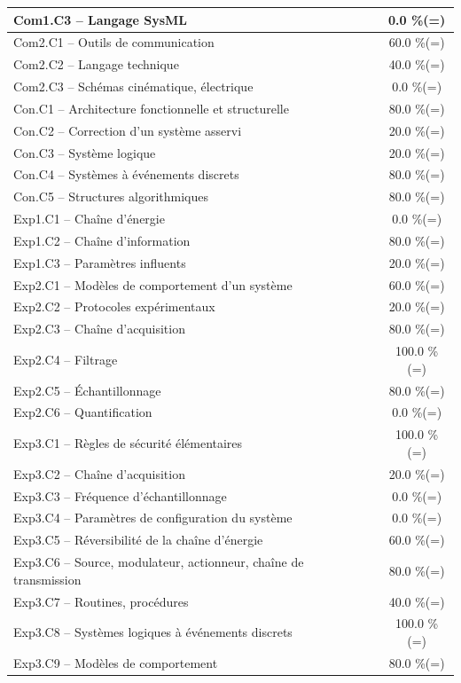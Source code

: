 \begin{center}
\begin{tabular}{|p{.7\linewidth}|c|}
Com1.C3 -- Langage SysML&0.0 \%(=)\\ \hline 
Com2.C1 -- Outils de communication&60.0 \%(=)\\ \hline 
Com2.C2 -- Langage technique&40.0 \%(=)\\ \hline 
Com2.C3 -- Schémas cinématique, électrique&0.0 \%(=)\\ \hline 
Con.C1 -- Architecture fonctionnelle et structurelle&80.0 \%(=)\\ \hline 
Con.C2 -- Correction d’un système asservi&20.0 \%(=)\\ \hline 
Con.C3 -- Système logique&20.0 \%(=)\\ \hline 
Con.C4 -- Systèmes à événements discrets&80.0 \%(=)\\ \hline 
Con.C5 -- Structures algorithmiques&80.0 \%(=)\\ \hline 
Exp1.C1 -- Chaîne d’énergie&0.0 \%(=)\\ \hline 
Exp1.C2 -- Chaîne d’information&80.0 \%(=)\\ \hline 
Exp1.C3 -- Paramètres influents&20.0 \%(=)\\ \hline 
Exp2.C1 -- Modèles de comportement d’un système&60.0 \%(=)\\ \hline 
Exp2.C2 -- Protocoles expérimentaux&20.0 \%(=)\\ \hline 
Exp2.C3 -- Chaîne d’acquisition&80.0 \%(=)\\ \hline 
Exp2.C4 -- Filtrage&100.0 \%(=)\\ \hline 
Exp2.C5 -- Échantillonnage&80.0 \%(=)\\ \hline 
Exp2.C6 -- Quantification&0.0 \%(=)\\ \hline 
Exp3.C1 -- Règles de sécurité élémentaires&100.0 \%(=)\\ \hline 
Exp3.C2 -- Chaîne d'acquisition&20.0 \%(=)\\ \hline 
Exp3.C3 -- Fréquence d’échantillonnage&0.0 \%(=)\\ \hline 
Exp3.C4 -- Paramètres de configuration du système&0.0 \%(=)\\ \hline 
Exp3.C5 -- Réversibilité de la chaîne d’énergie&60.0 \%(=)\\ \hline 
Exp3.C6 -- Source, modulateur, actionneur, chaîne de transmission&80.0 \%(=)\\ \hline 
Exp3.C7 -- Routines, procédures &40.0 \%(=)\\ \hline 
Exp3.C8 -- Systèmes logiques à événements discrets&100.0 \%(=)\\ \hline 
Exp3.C9 -- Modèles de comportement&80.0 \%(=)\\ \hline 

\end{tabular}
\end{center}
